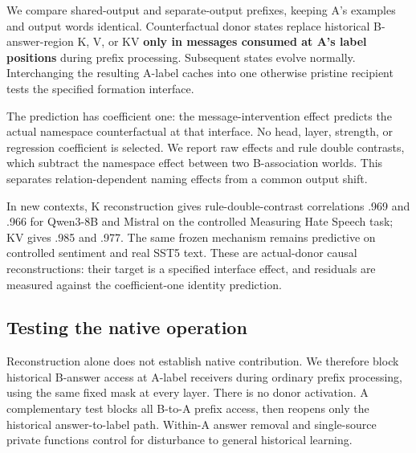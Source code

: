 \documentclass[11pt]{article}
\begin{document}
We compare shared-output and separate-output prefixes, keeping A's examples and output words identical. Counterfactual donor states replace historical B-answer-region K, V, or KV \textbf{only in messages consumed at A's label positions} during prefix processing. Subsequent states evolve normally. Interchanging the resulting A-label caches into one otherwise pristine recipient tests the specified formation interface.

The prediction has coefficient one: the message-intervention effect predicts the actual namespace counterfactual at that interface. No head, layer, strength, or regression coefficient is selected. We report raw effects and rule double contrasts, which subtract the namespace effect between two B-association worlds. This separates relation-dependent naming effects from a common output shift.

In new contexts, K reconstruction gives rule-double-contrast correlations .969 and .966 for Qwen3-8B and Mistral on the controlled Measuring Hate Speech task; KV gives .985 and .977. The same frozen mechanism remains predictive on controlled sentiment and real SST5 text. These are actual-donor causal reconstructions: their target is a specified interface effect, and residuals are measured against the coefficient-one identity prediction.

\subsection{Testing the native operation}\label{testing-the-native-operation}

Reconstruction alone does not establish native contribution. We therefore block historical B-answer access at A-label receivers during ordinary prefix processing, using the same fixed mask at every layer. There is no donor activation. A complementary test blocks all B-to-A prefix access, then reopens only the historical answer-to-label path. Within-A answer removal and single-source private functions control for disturbance to general historical learning.
\end{document}
